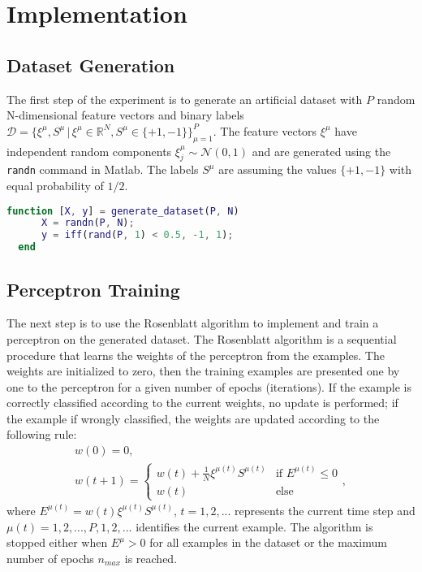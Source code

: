 \section{Implementation}

\subsection{Dataset Generation}
The first step of the experiment is to generate an artificial dataset with $P$ random N-dimensional feature vectors and binary labels $\mathcal{D} = \{ \xi^\mu, S^\mu \,|\, \xi^\mu \in \mathds{R}^N, S^\mu \in \{+1, -1\} \}_{\mu=1}^P$.
The feature vectors $\xi^\mu$ have independent random components $\xi_j^\mu \sim \mathcal{N}(0, 1)$ and are generated using the \texttt{randn} command in Matlab.
The labels $S^\mu$ are assuming the values $\{+1, -1\}$ with equal probability of $1/2$.

\begin{lstlisting}[language=Matlab]
  function [X, y] = generate_dataset(P, N)
      X = randn(P, N);
      y = iff(rand(P, 1) < 0.5, -1, 1);
  end
\end{lstlisting}

\subsection{Perceptron Training}
The next step is to use the Rosenblatt algorithm to implement and train a perceptron on the generated dataset.
The Rosenblatt algorithm is a sequential procedure that learns the weights of the perceptron from the examples.
The weights are initialized to zero, then the training examples are presented one by one to the perceptron for a given number of epochs (iterations).
If the example is correctly classified according to the current weights, no update is performed;
if the example if wrongly classified, the weights are updated according to the following rule:
\begin{gather*} 
    w(0) = 0, \\
    w(t + 1) =  \begin{cases}
                    w(t) + \frac{1}{N} \xi^{\mu(t)} S^{\mu(t)} &\text{if $E^{\mu(t)} \leq 0$}\\
                    w(t) &\text{else}
                \end{cases},
\end{gather*}
where $E^{\mu(t)} = w(t) \xi^{\mu(t)} S^{\mu(t)}$, $t = 1, 2, ...$ represents the current time step and $\mu(t) = 1, 2, ..., P, 1, 2, ...$ identifies the current example.
The algorithm is stopped either when $E^\mu > 0$ for all examples in the dataset or the maximum number of epochs $n_{max}$ is reached.

